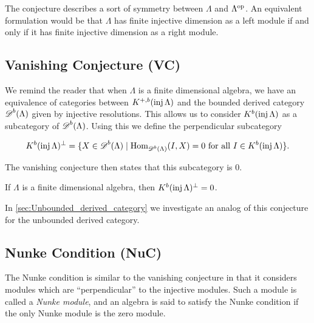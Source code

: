 The conjecture describes a sort of symmetry between $\Lambda$ and $\Lambda^{\operatorname{op}}$. An equivalent formulation would be that $\Lambda$ has finite injective dimension as a left module if and only if it has finite injective dimension as a right module.


\subsection*{Vanishing Conjecture (VC)}

We remind the reader that when $\Lambda$ is a finite dimensional algebra, we have an equivalence of categories between $K^{+,b}(\operatorname{inj}\Lambda)$ and the bounded derived category $\operatorname{\mathscr{D}}^b(\Lambda)$ given by injective resolutions. This allows us to consider $K^b(\operatorname{inj}\Lambda)$ as a subcategory of $\operatorname{\mathscr{D}}^b(\Lambda)$. Using this we define the perpendicular subcategory

$$K^b(\operatorname{inj}\Lambda)^\perp = \{X \in \operatorname{\mathscr{D}}^b(\Lambda) \mid \operatorname{Hom}_{\operatorname{\mathscr{D}}^b(\Lambda)}(I, X)=0 \text{ for all } I \in K^b(\operatorname{inj}\Lambda)\}.$$

The vanishing conjecture then states that this subcategory is 0.
\begin{conj} 
	If $\Lambda$ is a finite dimensional algebra, then $K^b(\operatorname{inj}\Lambda)^\perp = 0$.
\end{conj}

In \cref{sec:Unbounded_derived_category} we investigate an analog of this conjecture for the unbounded derived category.

\subsection*{Nunke Condition (NuC)}
The Nunke condition is similar to the vanishing conjecture in that it considers modules which are ``perpendicular'' to the injective modules. Such a module is called a \emph{Nunke module}, and an algebra is said to satisfy the Nunke condition if the only Nunke module is the zero module.

